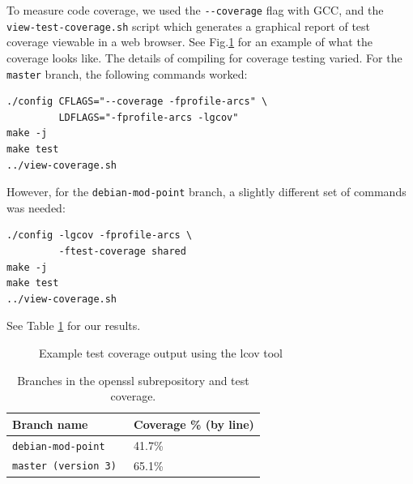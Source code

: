 \documentclass[conference]{IEEEtran}
\begin{document}
To measure code coverage, we used the \verb|--coverage| flag with GCC,
and the \verb|view-test-coverage.sh| script which generates a
graphical report of test coverage viewable in a web browser. See
Fig.\ref{coveragedemo} for an example of what the coverage looks
like. The details of compiling for coverage testing varied. For the
\verb|master| branch, the following commands worked:

\begin{verbatim}
./config CFLAGS="--coverage -fprofile-arcs" \
         LDFLAGS="-fprofile-arcs -lgcov"
make -j
make test
../view-coverage.sh
\end{verbatim}

However, for the \verb|debian-mod-point| branch, a slightly different
set of commands was needed:

\begin{verbatim}
./config -lgcov -fprofile-arcs \
         -ftest-coverage shared
make -j
make test
../view-coverage.sh
\end{verbatim}

See Table \ref{branches-coverage} for our results.

\begin{figure}[!t]
  \noindent{}
  \caption{Example test coverage output using the lcov tool}
  \label{coveragedemo}  
\end{figure}

\begin{table}[!t]
  \centering
  \begin{tabular}{|l|l|}
    \hline
    Branch name & Coverage \%  (by line)\\ \hline
    \verb|debian-mod-point| & 41.7\% \\ \hline
    \verb|master (version 3) | & 65.1\% \\ \hline
  \end{tabular}
  \caption{Branches in the openssl subrepository and test coverage.}
  \label{branches-coverage}
\end{table}
\end{document}
